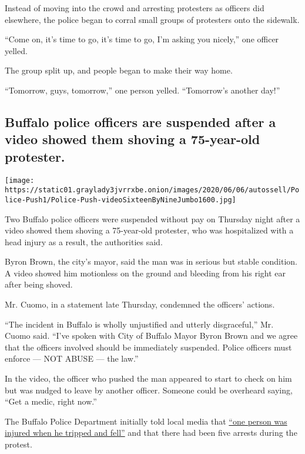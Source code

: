 Instead of moving into the crowd and arresting protesters as officers
did elsewhere, the police began to corral small groups of protesters
onto the sidewalk.

``Come on, it's time to go, it's time to go, I'm asking you nicely,''
one officer yelled.

The group split up, and people began to make their way home.

``Tomorrow, guys, tomorrow,'' one person yelled. ``Tomorrow's another
day!''

\hypertarget{buffalo-police-officers-are-suspended-after-a-video-showed-them-shoving-a-75-year-old-protester}{%
\subsection{Buffalo police officers are suspended after a video showed
them shoving a 75-year-old
protester.}\label{buffalo-police-officers-are-suspended-after-a-video-showed-them-shoving-a-75-year-old-protester}}

\texttt{[image: https://static01.graylady3jvrrxbe.onion/images/2020/06/06/autossell/Police-Push1/Police-Push-videoSixteenByNineJumbo1600.jpg]}

Two Buffalo police officers were suspended without pay on Thursday night
after a video showed them shoving a 75-year-old protester, who was
hospitalized with a head injury as a result, the authorities said.

Byron Brown, the city's mayor, said the man was in serious but stable
condition. A video showed him motionless on the ground and bleeding from
his right ear after being shoved.

Mr. Cuomo, in a statement late Thursday, condemned the officers'
actions.

``The incident in Buffalo is wholly unjustified and utterly
disgraceful,'' Mr. Cuomo said. ``I've spoken with City of Buffalo Mayor
Byron Brown and we agree that the officers involved should be
immediately suspended. Police officers must enforce --- NOT ABUSE ---
the law.''

In the video, the officer who pushed the man appeared to start to check
on him but was nudged to leave by another officer. Someone could be
overheard saying, ``Get a medic, right now.''

The Buffalo Police Department initially told local media that
\href{https://twitter.com/JeffRussoWKBW/status/1268712651292643334?s=20}{``one
person was injured when he tripped and fell''} and that there had been
five arrests during the protest.

